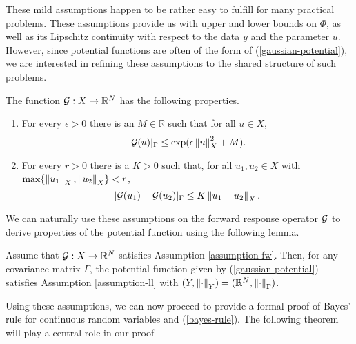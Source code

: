 These mild assumptions happen to be rather easy to fulfill for many practical problems. These assumptions provide us with upper and lower bounds on $\Phi$, as well as its Lipschitz continuity with respect to the data $y$ and the parameter $u$.  However, since potential functions are often of the form of (\ref{gaussian-potential}), we are interested in refining these assumptions to the shared structure of such problems.

\begin{assumption}\label{assumption-fw}
  The function $\mathcal{G} : X \rightarrow \mathbb{R}^N$ has the following properties.

  \begin{enumerate}
  \item For every $\epsilon > 0$ there is an $M \in \mathbb{R}$ such that for all $u \in X$,
    \begin{equation*}
      |\mathcal{G}(u)|_\Gamma \le \exp(\epsilon \left\lVert u\right\rVert_X^2 + M).
    \end{equation*}
  \item For every $r > 0$ there is a $K > 0$ such that, for all $u_1, u_2 \in X$ with $\text{max}\{\left\lVert u_1\right\rVert_X, \left\lVert u_2\right\rVert_X\} < r$,
    \begin{equation*}
      |\mathcal{G}(u_1) - \mathcal{G}(u_2)|_\Gamma \le K\left\lVert u_1 - u_2\right\rVert_X.
    \end{equation*}
  \end{enumerate}
\end{assumption}

We can naturally use these assumptions on the forward response operator $\mathcal{G}$ to derive properties of the potential function using the following lemma.

\begin{lemma} \label{fw-implies-ll}
  Assume that $\mathcal{G}  : X \rightarrow \mathbb{R}^N$ satisfies Assumption \ref{assumption-fw}. Then, for any covariance matrix $\Gamma$, the potential function given by (\ref{gaussian-potential}) satisfies Assumption \ref{assumption-ll} with $(Y, \left\lVert\cdot\right\rVert_Y) = (\mathbb{R}^N, \left\lVert\cdot\right\rVert_\Gamma)$.
\end{lemma}

Using these assumptions, we can now proceed to provide a formal proof of Bayes' rule for continuous random variables and (\ref{bayes-rule}). The following theorem will play a central role in our proof

